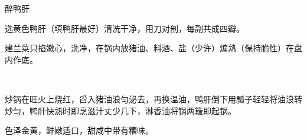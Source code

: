 \begin{recipe}{醉鸭肝}

\ingredients


\preparation

\step 选黄色鸭肝（填鸭肝最好）清洗干净，用刀对剖，每副共成四瓣。

\step 建兰菜只掐嫩心，洗净，在锅内放猪油、料酒、盐（少许）煸熟（保持脆性）在盘
内作底。

\step 𰪿糟浮子、甜酱、酱油、胡椒面、白糖、味精、水亘粉及清汤少许兑成滋汁。

\step 炒锅在旺火上烧红，舀入猪油浪匀泌去，再换温油，鸭肝倒下用瓢子轻轻将油浪转
炒匀，鸭肝快熟时即烹滋汁丈少几下，淋香油将锅两簸即起锅。

\features

色泽金黄，鲜嫩适口，甜咸中带有糟味。

\end{recipe}


